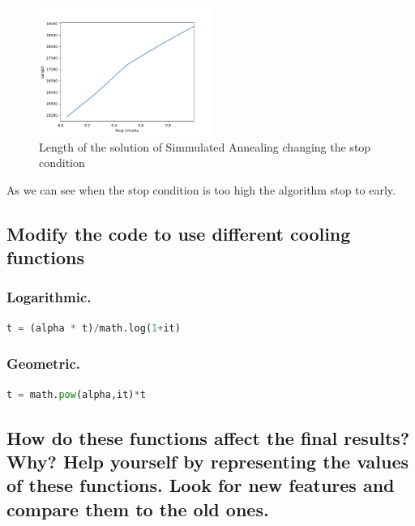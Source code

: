 \documentclass{article}
\begin{document}
            \begin{figure}[H]

                \centering
                \includegraphics[width=0.5\textwidth]{../media/03.SimAnnealing-Stop-criteria-length-75cities.png}
                \caption{Length of the solution of Simmulated Annealing changing the stop condition}
                \label{Length of the solution of Simmulated Annealing changing the stop condition temperature}
    
            \end{figure}

            As we can see when the stop condition is too high the algorithm stop to early.


        \subsection{Modify the code to use different cooling functions}
    
            \subsubsection{Logarithmic.}

                \begin{lstlisting}[language=Python]
                    t = (alpha * t)/math.log(1+it)
                \end{lstlisting}

    
            \subsubsection{Geometric.}
            
                \begin{lstlisting}[language=Python]
                    t = math.pow(alpha,it)*t 
                \end{lstlisting}

        \subsection{How do these functions affect the final results? Why? Help yourself by representing the values of these functions. Look for new features and compare them to the old ones.}
\end{document}
